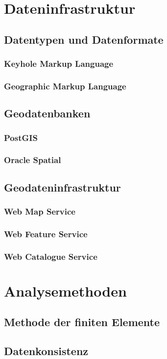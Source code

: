 \section{Dateninfrastruktur}
\subsection{Datentypen und Datenformate}
\subsubsection{Keyhole Markup Language}
\subsubsection{Geographic Markup Language}
\subsection{Geodatenbanken}
\subsubsection{PostGIS}
\subsubsection{Oracle Spatial}
\subsection{Geodateninfrastruktur}
\subsubsection{Web Map Service}
\subsubsection{Web Feature Service}
\subsubsection{Web Catalogue Service}

\section{Analysemethoden}
\subsection{Methode der finiten Elemente}
\subsection{Datenkonsistenz}


